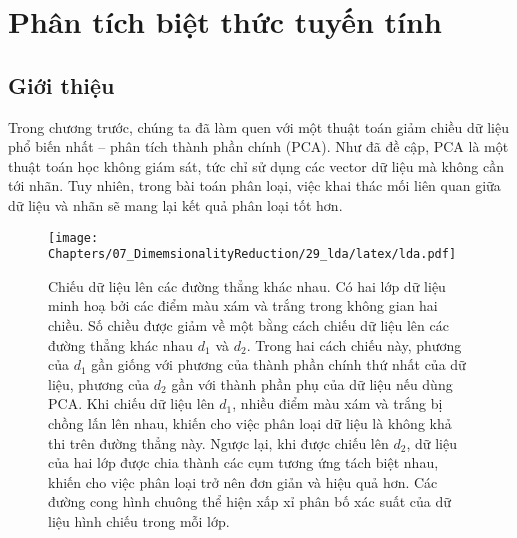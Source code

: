 \chapter{Phân tích biệt thức tuyến tính}
\section{Giới thiệu}
Trong chương trước, chúng ta đã làm quen với một thuật toán giảm chiều dữ liệu
phổ biến nhất  --  phân tích thành phần chính (PCA). Như đã đề cập, PCA là một thuật toán học không giám sát, tức chỉ sử dụng các vector dữ liệu mà
không cần tới nhãn. Tuy nhiên, trong bài toán phân loại,
việc khai thác mối liên quan giữa dữ liệu và nhãn sẽ mang lại kết quả phân loại
tốt hơn.

\begin{figure}[t]
\centering
\texttt{[image: Chapters/07\_DimemsionalityReduction/29\_lda/latex/lda.pdf]}
\caption[]{Chiếu dữ liệu lên các đường thẳng khác nhau. Có hai lớp dữ liệu
minh hoạ bởi các điểm màu xám và trắng trong không gian hai chiều. Số chiều
được giảm về một bằng cách chiếu dữ liệu lên các đường thẳng khác nhau $d_1$
và $d_2$. Trong hai cách chiếu này, phương của $d_1$ gần giống với phương
của thành phần chính thứ nhất của dữ liệu, phương của $d_2$ gần với thành
phần phụ của dữ liệu nếu dùng PCA. Khi chiếu dữ liệu lên $d_1$, nhiều điểm
màu xám và trắng bị chồng lấn lên nhau, khiến cho việc phân loại dữ liệu là
không khả thi trên đường thẳng này. Ngược lại, khi được chiếu lên $d_2$, dữ
liệu của hai lớp được chia thành các cụm tương ứng tách biệt nhau, khiến cho
việc phân loại trở nên đơn giản và hiệu quả hơn. Các đường cong hình
chuông thể hiện xấp xỉ phân bố xác suất của dữ liệu hình chiếu trong mỗi
lớp.}
\label{fig:29_1}
\end{figure}


